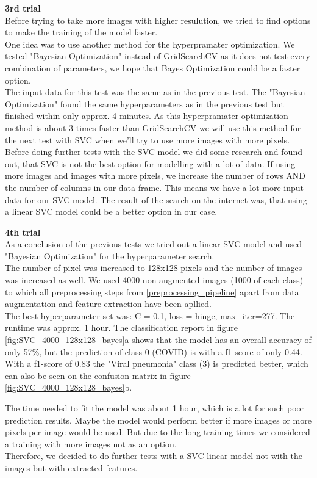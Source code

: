 \documentclass{article}
\begin{document}
\textbf{3rd trial}\\
Before trying to take more images with higher resulution, we tried to find options to make the training of the model faster.\\
One idea was to use another method for the hyperpramater optimization. We tested "Bayesian Optimization" instead of GridSearchCV as it does not test every 
combination of parameters, we hope that Bayes Optimization could be a faster option.\\
The input data for this test was the same as in the previous test. The "Bayesian Optimization" found the same hyperparameters as in the previous test but finished 
within only approx. 4 minutes. As this hyperpramater optimization method is about 3 times faster than GridSearchCV we will use this method for the next test with SVC 
when we'll try to use more images with more pixels. \\
Before doing further tests with the SVC model we did some research and found out, that SVC is not the best option for modelling with a lot of data. 
If using more images and images with more pixels, we increase the number of rows AND the number of columns in our data frame. This means we have a lot more input
data for our SVC model. The result of the search on the internet was, that using a linear SVC model could be a better option in our case. 

\textbf{4th trial}\\
As a conclusion of the previous tests we tried out a linear SVC model and used "Bayesian Optimization" for the hyperparameter search.\\
The number of pixel was increased to 128x128 pixels and the number of images was increased as well. We used 4000 non-augmented images (1000 of each class) to  which all
preprocessing steps from \ref{preprocessing_pipeline} apart from data augmentation and feature extraction have been apllied. \\

The best hyperparameter set was: C = 0.1,  loss = hinge, max\_iter=277. The runtime was approx. 1 hour. The classification report in figure 
\ref{fig:SVC_4000_128x128_bayes}a shows that the model has an overall accuracy of only  57\%, but the prediction of class 0 (COVID) is  with a f1-score of 
only 0.44. With a f1-score of 0.83 the "Viral pneumonia" class (3) is predicted better, which can also be seen on the confusion matrix in figure 
\ref{fig:SVC_4000_128x128_bayes}b.

The time needed to fit the model was about 1 hour, which is a lot for such poor prediction results. Maybe the model would perform better if more images or more pixels per image would be used. But due to the long training times we considered a training with more images not as an option.\\
Therefore, we decided to do further tests with a SVC linear model not with the images but with extracted features.\\
\end{document}
